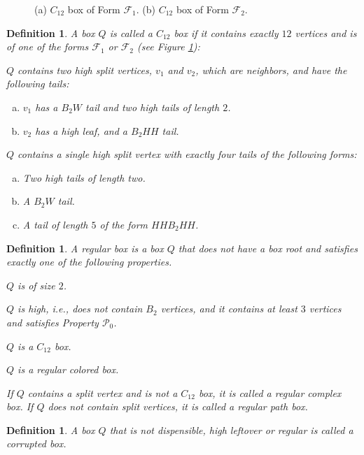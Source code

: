 \documentclass[11pt]{article}
\def\dnsitem{\vspace{-7pt}\item}
\def\dnssubitem{\vspace{-5pt}\item}
\newtheorem{definition}[theorem]{Definition}
\theoremstyle{definition}
\def\propt1{\mathcal{P}_0}
\def\formcto{\mathcal{F}_1}
\def\formctt{\mathcal{F}_2}
\def\regtwo{\mathcal{R}_1}
\def\regclean{\mathcal{R}_2}
\def\regct{\mathcal{R}_3}
\def\regcolored{\mathcal{R}_4}
\begin{document}
\begin{figure}[thbp]
  \caption{\sf (a) $C_{12}$ box of Form $\formcto$. 
	      (b) $C_{12}$ box of Form $\formctt$. 
	}
  \medskip
  \centering
  \label{fig:c12_box}
\end{figure}

\begin{definition}
A box $Q$ is called a \emph{$C_{12}$ box} if it contains exactly $12$ vertices and is of one of the forms $\formcto$ or $\formctt$ (see Figure \ref{fig:c12_box}):
\begin{description}
	\dnsitem[$\formcto$.]
	$Q$ contains two high split vertices, $v_1$ and $v_2$, which are neighbors, and have the following tails:
	\begin{enumerate}[(a)]
		\dnsitem $v_1$ has a $B_2W$ tail and two high tails of length $2$.
		\dnssubitem $v_2$ has a high leaf, and a $B_2HH$ tail.
	\end{enumerate}

	\dnsitem[$\formctt$.]
	$Q$ contains a single high split vertex with exactly four tails of the following forms:
	\begin{enumerate}[(a)]
		\dnsitem Two high tails of length two.
		\dnssubitem A $B_2W$ tail.
		\dnssubitem A tail of length $5$ of the form $HHB_2HH$.

	\end{enumerate}
\end{description}
\end{definition}


\begin{definition}
\label{def:regular_box}
A \emph{regular box} is a box $Q$ that does not have a box root and satisfies exactly one of the following properties.
\begin{description}
	\dnsitem[$\regtwo$.] $Q$ is of size $2$.
	\dnsitem[$\regclean$.] $Q$ is high, i.e., does not contain $B_2$ vertices, and it contains at least $3$ vertices and satisfies Property $\propt1$.
	\dnsitem[$\regct$.] $Q$ is a $C_{12}$ box.
	\dnsitem[$\regcolored$.] $Q$ is a regular colored box.
\end{description}

If $Q$ contains a split vertex and is not a $C_{12}$ box, it is called a \emph{regular complex} box.
If $Q$ does not contain split vertices, it is called a \emph{regular path} box.
\end{definition}

\begin{definition}
A box $Q$ that is not dispensible, high leftover or regular is called a \emph{corrupted box}. 
\end{definition}
\end{document}
